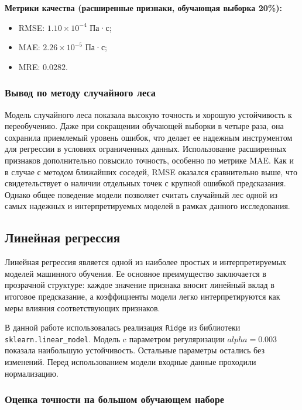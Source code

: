 \documentclass[a4paper,12pt]{article}
\begin{document}
    \begin{minipage}{\textwidth}
      \textbf{Метрики качества (расширенные признаки, обучающая выборка 20\%):}
      \begin{itemize}
          \item RMSE: \( 1.10 \times 10^{-4} \) Па·с;
          \item MAE: \( 2.26 \times 10^{-5} \) Па·с;
          \item MRE: \( 0.0282 \).
      \end{itemize}
    \end{minipage}
    
    \subsubsection{Вывод по методу случайного леса}
    
    Модель случайного леса показала высокую точность и хорошую устойчивость к переобучению. Даже при сокращении обучающей выборки в четыре раза, она сохранила приемлемый уровень ошибок, что делает ее надежным инструментом для регрессии в условиях ограниченных данных. Использование расширенных признаков дополнительно повысило точность, особенно по метрике MAE. Как и в случае с методом ближайших соседей, RMSE оказался сравнительно выше, что свидетельствует о наличии отдельных точек с крупной ошибкой предсказания. Однако общее поведение модели позволяет считать случайный лес одной из самых надежных и интерпретируемых моделей в рамках данного исследования.

  \subsection{Линейная регрессия}

    Линейная регрессия является одной из наиболее простых и интерпретируемых моделей машинного обучения. Ее основное преимущество заключается в прозрачной структуре: каждое значение признака вносит линейный вклад в итоговое предсказание, а коэффициенты модели легко интерпретируются как меры влияния соответствующих признаков.

    В данной работе использовалась реализация \texttt{Ridge} из библиотеки \texttt{sklearn.linear\_model}. Модель c параметром регуляризации \( alpha = 0.003 \) показала наибольшую устойчивость. Остальные параметры остались без изменений. Перед использованием модели входные данные проходили нормализацию.
    
    \subsubsection{Оценка точности на большом обучающем наборе}
    
\end{document}
